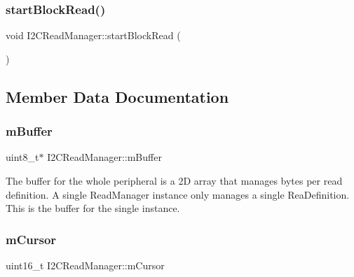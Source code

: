 \subsubsection{\texorpdfstring{start\+Block\+Read()}{startBlockRead()}}
{\footnotesize\ttfamily void I2\+C\+Read\+Manager\+::start\+Block\+Read (\begin{DoxyParamCaption}{ }\end{DoxyParamCaption})\hspace{0.3cm}{\ttfamily [private]}}



\subsection{Member Data Documentation}
\mbox{\label{class_i2_c_read_manager_af4df317c2ac86fa929f85c96b5d9a56b}} 
\subsubsection{\texorpdfstring{m\+Buffer}{mBuffer}}
{\footnotesize\ttfamily uint8\+\_\+t$\ast$ I2\+C\+Read\+Manager\+::m\+Buffer\hspace{0.3cm}{\ttfamily [private]}}

The buffer for the whole peripheral is a 2D array that manages bytes per read definition. A single Read\+Manager instance only manages a single Rea\+Definition. This is the buffer for the single instance. \mbox{\label{class_i2_c_read_manager_a38cc98d6047836aec409733a8591ce2e}} 
\subsubsection{\texorpdfstring{m\+Cursor}{mCursor}}
{\footnotesize\ttfamily uint16\+\_\+t I2\+C\+Read\+Manager\+::m\+Cursor\hspace{0.3cm}{\ttfamily [private]}}

\mbox{\label{class_i2_c_read_manager_a9a3f55a2c1fed16d7e17b16c153f0b32}} 
